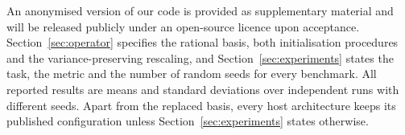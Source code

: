 \documentclass{article} %
\begin{document}
An anonymised version of our code is provided as supplementary material and
will be released publicly under an open-source licence upon acceptance.
Section~\ref{sec:operator} specifies the rational basis, both initialisation
procedures and the variance-preserving rescaling, and
Section~\ref{sec:experiments} states the task, the metric and the number of
random seeds for every benchmark. All reported results are means and standard
deviations over independent runs with different seeds. Apart from the replaced
basis, every host architecture keeps its published configuration unless
Section~\ref{sec:experiments} states otherwise.


\enlargethispage{2\baselineskip}

\end{document}
